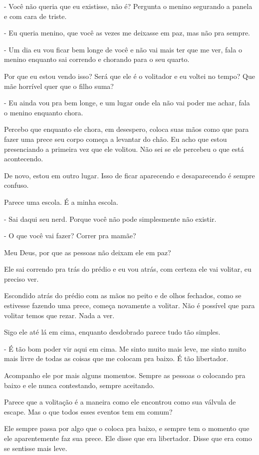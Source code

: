 - Você não queria que eu existisse, não é? Pergunta o menino segurando a panela e com cara de triste.

- Eu queria menino, que você as vezes me deixasse em paz, mas não pra sempre.

- Um dia eu vou ficar bem longe de você e não vai mais ter que me ver, fala o menino enquanto sai correndo e chorando para o seu quarto.

Por que eu estou vendo isso? Será que ele é o volitador e eu voltei no tempo? Que mãe horrível quer que o filho suma?

- Eu ainda vou pra bem longe, e um lugar onde ela não vai poder me achar, fala o menino enquanto chora.

Percebo que enquanto ele chora, em desespero, coloca suas mãos como que para fazer uma prece seu corpo começa a levantar do chão. Eu acho que estou presenciando a primeira vez que ele volitou. Não sei se ele percebeu o que está acontecendo.

De novo, estou em outro lugar. Isso de ficar aparecendo e desaparecendo é sempre confuso.

Parece uma escola. É a minha escola.

- Sai daqui seu nerd. Porque você não pode simplesmente não existir.

- O que você vai fazer? Correr pra mamãe?

Meu Deus, por que as pessoas não deixam ele em paz?

Ele sai correndo pra trás do prédio e eu vou atrás, com certeza ele vai volitar, eu preciso ver.

Escondido atrás do prédio com as mãos no peito e de olhos fechados, como se estivesse fazendo uma prece, começa novamente a volitar. Não é possível que para volitar temos que rezar. Nada a ver.

Sigo ele até lá em cima, enquanto desdobrado parece tudo tão simples.

- É tão bom poder vir aqui em cima. Me sinto muito mais leve, me sinto muito mais livre de todas as coisas que me colocam pra baixo. É tão libertador.

Acompanho ele por mais alguns momentos. Sempre as pessoas o colocando pra baixo e ele nunca contestando, sempre aceitando.

Parece que a volitação é a maneira como ele encontrou como sua válvula de escape. Mas o que todos esses eventos tem em comum?

Ele sempre passa por algo que o coloca pra baixo, e sempre tem o momento que ele aparentemente faz sua prece. Ele disse que era libertador. Disse que era como se sentisse mais leve.


